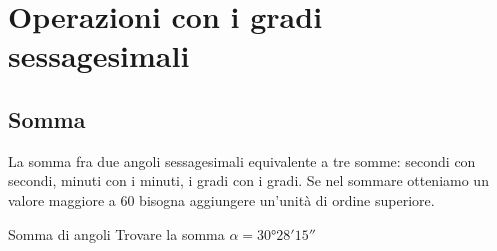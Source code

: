 \section{Operazioni con i gradi sessagesimali}
\subsection{Somma}
La somma fra due angoli sessagesimali equivalente a tre somme: secondi con secondi, minuti con i minuti, i gradi con i gradi. Se nel sommare otteniamo un valore maggiore a $60$ bisogna aggiungere un'unità di ordine superiore.
\begin{esempiot}{Somma di angoli}{}
	Trovare la somma $\alpha=\ang{30;28;15}$
\end{esempiot}